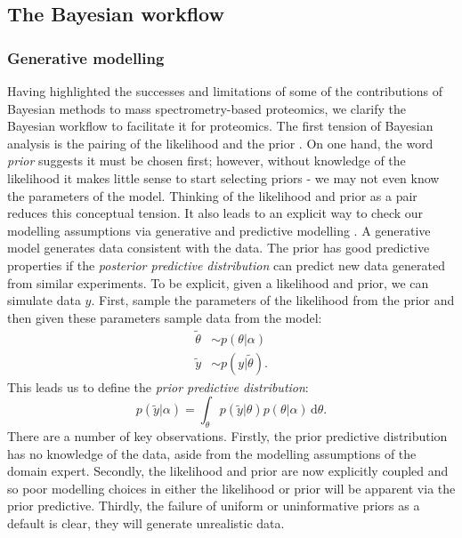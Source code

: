 \documentclass[12pt,english]{article}
\begin{document}
\subsection{The Bayesian workflow}
\subsubsection{Generative modelling}
Having highlighted the successes and limitations of some of the contributions of Bayesian methods to mass spectrometry-based proteomics, we clarify the Bayesian workflow to facilitate it for proteomics. The first tension of Bayesian analysis is the pairing of the likelihood and the prior \citep{Gelman::2017, Gelman::2020, Betancourt::2021}. On one hand, the word \textit{prior} suggests it must be chosen first; however, without knowledge of the likelihood it makes little sense to start selecting priors - we  may not even know the parameters of the model. Thinking of the likelihood and prior as a pair reduces this conceptual tension. It also leads to an explicit way to check our modelling assumptions via generative and predictive modelling \citep{Betancourt::2021}. A generative model generates data consistent with the data. The prior has good predictive properties if the \textit{posterior predictive distribution} can predict new data generated from similar experiments. To be explicit, given a likelihood and prior, we can simulate data $y$. First, sample the parameters of the likelihood from the prior and then given these parameters sample data from the model:	
\begin{equation}
\begin{split}
\tilde{\theta} &\sim p(\theta|\alpha) \\
\tilde{y} & \sim p(y|\tilde{\theta}).
\end{split}
\end{equation}
This leads us to define the \textit{prior predictive distribution}:
\begin{equation}
p(\tilde{y}|\alpha) = \int_{\theta} p(\tilde{y}|\theta)p(\theta|\alpha)\, \text{d}\theta.
\end{equation}
There are a number of key observations. Firstly, the prior predictive distribution has no knowledge of the data, aside from the modelling assumptions of the domain expert. Secondly, the likelihood and prior are now explicitly coupled and so poor modelling choices in either the likelihood or prior will be apparent via the prior predictive. Thirdly, the failure of uniform or uninformative priors as a default is clear, they will generate unrealistic data.
\end{document}
